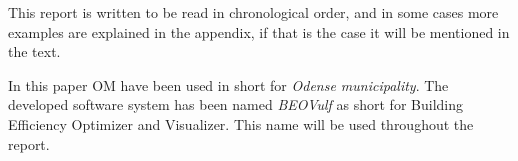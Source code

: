 This report is written to be read in chronological order, and in some cases more examples are explained in the appendix, if that is the case it will be mentioned in the text.

In this paper OM have been used in short for \emph{Odense municipality}. The developed software system has been named \emph{BEOVulf} as short for Building Efficiency Optimizer and Visualizer. This name will be used throughout the report.